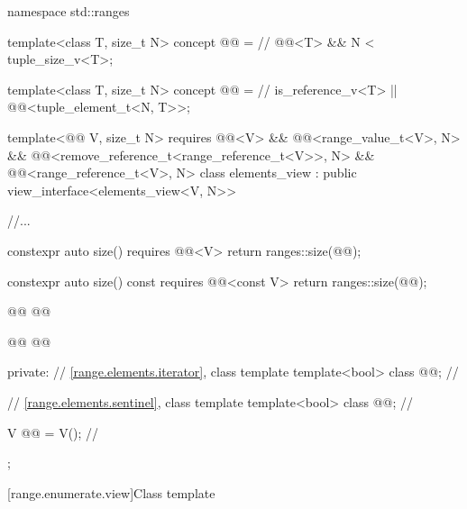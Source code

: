 \documentclass{wg21}
\begin{document}
%
%
%
%
%
\begin{codeblock}
namespace std::ranges {
template<class T, size_t N>
concept @@ =                   // \expos
@@<T> && N < tuple_size_v<T>;

template<class T, size_t N>
concept @@ =                  // \expos
is_reference_v<T> || @@<tuple_element_t<N, T>>;

template<@@ V, size_t N>
requires @@<V> && @@<range_value_t<V>, N> &&
@@<remove_reference_t<range_reference_t<V>>, N> &&
@@<range_reference_t<V>, N>
class elements_view : public view_interface<elements_view<V, N>> {
    //...

    constexpr auto size() requires @@<V>
    { return ranges::size(@@); }

    constexpr auto size() const requires @@<const V>
    { return ranges::size(@@); }

    @@
    @@

    @@
    @@

    private:
    // \ref{range.elements.iterator}, class template 
    template<bool> class @@;                      // \expos

    // \ref{range.elements.sentinel}, class template 
    template<bool> class @@;                      // \expos

    V @@ = V();                                      // \expos
};
}
\end{codeblock}


[range.enumerate.view]{Class template }
\end{document}

